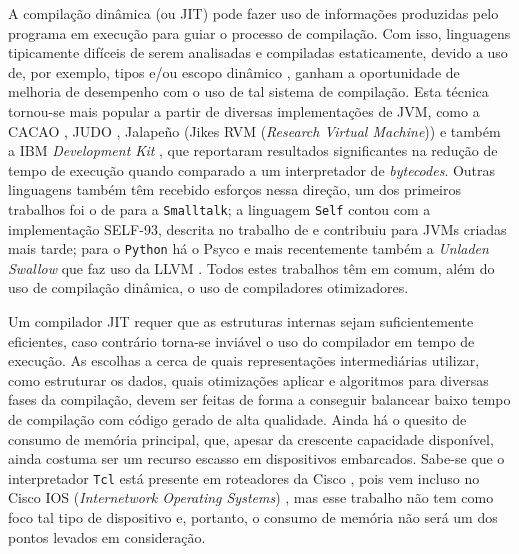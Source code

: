 A compilação dinâmica (ou JIT) pode fazer uso de informações produzidas
pelo programa em execução para guiar o processo de compilação. Com
isso, linguagens tipicamente difíceis de serem analisadas e compiladas
estaticamente, devido a uso de, por exemplo, tipos e/ou
escopo dinâmico \cite{holzle}, %
 ganham a oportunidade de melhoria de desempenho com
o uso de tal sistema de compilação. Esta técnica tornou-se mais popular a
partir de diversas implementações de JVM, como a
CACAO \cite{cacao}, JUDO \cite{judo},
Jalapeño (Jikes RVM (\textit{Research Virtual
  Machine})) \cite{jalapeno_1} e também a IBM \textit{Development Kit}
\cite{suganuma_ibm}, que reportaram resultados
significantes na redução de tempo de execução quando comparado a um
interpretador de \textit{bytecodes}. Outras linguagens também têm
recebido esforços nessa direção, um dos primeiros trabalhos foi o de
 para a \texttt{Smalltalk}; a
linguagem \texttt{Self} contou com a implementação SELF-93, descrita
no trabalho de  e contribuiu para JVMs criadas mais
tarde; para o
\texttt{Python} há o Psyco
\cite{psyco} e mais recentemente também a \textit{Unladen Swallow}
que faz uso da LLVM \cite{llvm1}. Todos estes trabalhos têm em comum,
além do uso de compilação dinâmica, o uso de
compiladores otimizadores.

Um compilador JIT requer que as estruturas internas sejam
suficientemente eficientes, caso contrário torna-se inviável o
uso do compilador em tempo de execução. As escolhas a
cerca de quais representações intermediárias utilizar, como estruturar
os dados, quais otimizações aplicar e algoritmos para diversas fases da
compilação, devem ser feitas de forma a conseguir balancear baixo
tempo de compilação com código gerado de alta qualidade. Ainda há o
quesito de consumo de memória principal, que, apesar da crescente
capacidade disponível, ainda costuma ser um recurso escasso em
dispositivos embarcados. Sabe-se que o interpretador \texttt{Tcl} está
presente em roteadores da Cisco \cite{cisco}, pois vem incluso no Cisco IOS
(\textit{Internetwork Operating Systems}) \cite{cisco_ios}, mas esse trabalho
não tem como foco tal tipo de dispositivo e, portanto, o consumo de
memória não será um dos pontos levados em consideração.

